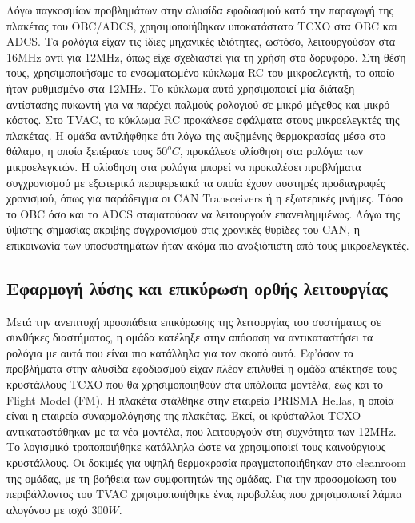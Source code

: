 \documentclass[a4paper,nobib,justified]{tufte-book}
\begin{document}
Λόγω παγκοσμίων προβλημάτων στην αλυσίδα εφοδιασμού κατά την παραγωγή της πλακέτας του OBC/ADCS, χρησιμοποιήθηκαν υποκατάστατα TCXO στα OBC και ADCS. Τα ρολόγια είχαν τις ίδιες μηχανικές ιδιότητες, ωστόσο, λειτουργούσαν στα 16MHz αντί για 12MHz, όπως είχε σχεδιαστεί για τη χρήση στο δορυφόρο. Στη θέση τους, χρησιμοποιήσαμε το ενσωματωμένο κύκλωμα RC του μικροελεγκτή, το οποίο ήταν ρυθμισμένο στα 12MHz. Το κύκλωμα αυτό χρησιμοποιεί μία διάταξη αντίστασης-πυκωντή για να παρέχει παλμούς ρολογιού σε μικρό μέγεθος και μικρό κόστος. Στο TVAC, το κύκλωμα RC προκάλεσε σφάλματα στους μικροελεγκτές της πλακέτας. Η ομάδα αντιλήφθηκε ότι λόγω της αυξημένης θερμοκρασίας μέσα στο θάλαμο, η οποία ξεπέρασε τους $50^o C$, προκάλεσε ολίσθηση στα ρολόγια των μικροελεγκτών. Η ολίσθηση στα ρολόγια μπορεί να προκαλέσει προβλήματα συγχρονισμού με εξωτερικά περιφερειακά τα οποία έχουν αυστηρές προδιαγραφές χρονισμού, όπως για παράδειγμα οι CAN Transceivers ή η εξωτερικές μνήμες. Τόσο το OBC όσο και το ADCS σταματούσαν να λειτουργούν επανειλημμένως. Λόγω της ύψιστης σημασίας ακριβής συγχρονισμού στις χρονικές θυρίδες του CAN, η επικοινωνία των υποσυστημάτων ήταν ακόμα πιο αναξιόπιστη από τους μικροελεγκτές.

\subsection{Εφαρμογή λύσης και επικύρωση ορθής λειτουργίας}
Μετά την ανεπιτυχή προσπάθεια επικύρωσης της λειτουργίας του συστήματος σε συνθήκες διαστήματος, η ομάδα κατέληξε στην απόφαση να αντικαταστήσει τα ρολόγια με αυτά που είναι πιο κατάλληλα για τον σκοπό αυτό. Εφ'όσον τα προβλήματα στην αλυσίδα εφοδιασμού είχαν πλέον επιλυθεί η ομάδα απέκτησε τους κρυστάλλους TCXO που θα χρησιμοποιηθούν στα υπόλοιπα μοντέλα, έως και το Flight Model (FM). Η πλακέτα στάλθηκε στην εταιρεία PRISMA Hellas, η οποία είναι η εταιρεία συναρμολόγησης της πλακέτας. Εκεί, οι κρύσταλλοι TCXO αντικαταστάθηκαν με τα νέα μοντέλα, που λειτουργούν στη συχνότητα των 12MHz. Το λογισμικό τροποποιήθηκε κατάλληλα ώστε να χρησιμοποιεί τους καινούργιους κρυστάλλους. Οι δοκιμές για υψηλή θερμοκρασία πραγματοποιήθηκαν στο cleanroom της ομάδας, με τη βοήθεια των συμφοιτητών της ομάδας. Για την προσομοίωση του περιβάλλοντος του TVAC χρησιμοποιήθηκε ένας προβολέας που χρησιμοποιεί λάμπα αλογόνου με ισχύ $300W$.
\end{document}
